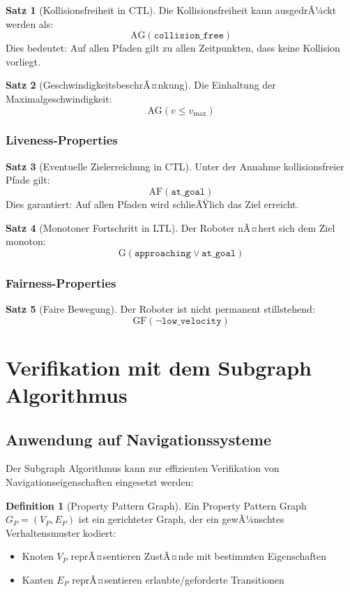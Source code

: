 ﻿\documentclass[a4paper,12pt]{article}
\theoremstyle{definition}
\newtheorem{definition}{Definition}[section]
\newtheorem{satz}{Satz}[section]
\begin{document}
\begin{satz}[Kollisionsfreiheit in CTL]
Die Kollisionsfreiheit kann ausgedrÃ¼ckt werden als:
\[
\text{AG}(\texttt{collision\_free})
\]
Dies bedeutet: Auf allen Pfaden gilt zu allen Zeitpunkten, dass keine Kollision vorliegt.
\end{satz}

\begin{satz}[GeschwindigkeitsbeschrÃ¤nkung]
Die Einhaltung der Maximalgeschwindigkeit:
\[
\text{AG}(v \leq v_{\max})
\]
\end{satz}

\subsubsection{Liveness-Properties}

\begin{satz}[Eventuelle Zielerreichung in CTL]
Unter der Annahme kollisionsfreier Pfade gilt:
\[
\text{AF}(\texttt{at\_goal})
\]
Dies garantiert: Auf allen Pfaden wird schlieÃŸlich das Ziel erreicht.
\end{satz}

\begin{satz}[Monotoner Fortschritt in LTL]
Der Roboter nÃ¤hert sich dem Ziel monoton:
\[
\text{G}(\texttt{approaching} \lor \texttt{at\_goal})
\]
\end{satz}

\subsubsection{Fairness-Properties}

\begin{satz}[Faire Bewegung]
Der Roboter ist nicht permanent stillstehend:
\[
\text{GF}(\neg \texttt{low\_velocity})
\]
\end{satz}

\section{Verifikation mit dem Subgraph Algorithmus}

\subsection{Anwendung auf Navigationssysteme}

Der Subgraph Algorithmus kann zur effizienten Verifikation von Navigationseigenschaften eingesetzt werden:

\begin{definition}[Property Pattern Graph]
Ein Property Pattern Graph $G_P = (V_P, E_P)$ ist ein gerichteter Graph, der ein gewÃ¼nschtes Verhaltensmuster kodiert:
\begin{itemize}
	\item Knoten $V_P$ reprÃ¤sentieren ZustÃ¤nde mit bestimmten Eigenschaften
	\item Kanten $E_P$ reprÃ¤sentieren erlaubte/geforderte Transitionen
\end{itemize}
\end{definition}
\end{document}
